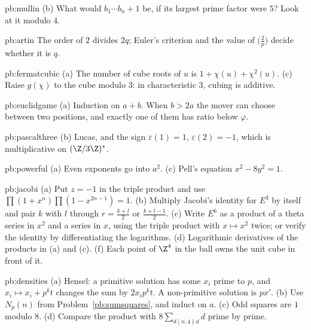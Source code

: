 \begin{hint}{pb:mullin}
(b) What would $b_1\cdots b_n+1$ be, if its largest prime factor were $5$? Look at it modulo $4$.
\end{hint}

\begin{hint}{pb:artin}
The order of $2$ divides $2q$; Euler's criterion and the value of $\bigl(\frac2p\bigr)$ decide whether it is $q$.
\end{hint}

\begin{hint}{pb:fermatcubic}
(a) The number of cube roots of $u$ is $1+\chi(u)+\chi^2(u)$. (c) Raise $g(\chi)$ to the cube modulo $3$: in characteristic $3$,
cubing is additive.
\end{hint}

\begin{hint}{pb:euclidgame}
(a) Induction on $a+b$. When $b>2a$ the mover can choose between two positions, and exactly one of them has ratio below
$\varphi$.
\end{hint}

\begin{hint}{pb:pascalthree}
(b) Lucas, and the sign $\varepsilon(1)=1$, $\varepsilon(2)=-1$, which is multiplicative on $(\Z/3\Z)^*$.
\end{hint}

\begin{hint}{pb:powerful}
(a) Even exponents go into $a^2$. (c) Pell's equation $x^2-8y^2=1$.
\end{hint}

\begin{hint}{pb:jacobi}
(a) Put $z=-1$ in the triple product and use $\prod(1+x^n)\prod(1-x^{2n-1})=1$. (b) Multiply Jacobi's identity for $E^3$ by itself and pair $k$ with $l$ through $r=\frac{k+l}2$
or $\frac{k+l-1}2$. (c) Write $E^6$ as a product of a theta series in $x^2$ and a series in $x$, using the triple product with $x\mapsto x^2$ twice; or verify the identity
by differentiating the logarithms. (d) Logarithmic derivatives of the products in (a) and (c). (f) Each point of $\Z^4$ in the ball owns the unit cube in front of it.
\end{hint}

\begin{hint}{pb:densities}
(a) Hensel: a primitive solution has some $x_i$ prime to $p$, and $x_i\mapsto x_i+p^kt$ changes the sum by $2x_ip^kt$. A non-primitive solution is $px'$. (b) Use $N_p(n)$
from Problem~\ref{pb:sumsquares}, and induct on $a$. (c) Odd squares are $1$ modulo $8$. (d) Compare the product with $8\sum_{d\mid n,4\nmid d}d$ prime by prime.
\end{hint}

